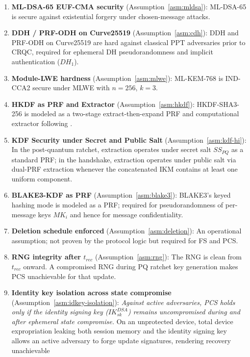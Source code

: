 \documentclass[11pt,a4paper]{article}
\theoremstyle{remark}
\theoremstyle{plain}
\begin{document}
\begin{enumerate}
  \item \textbf{ML-DSA-65 EUF-CMA security} (Assumption~\ref{asm:mldsa}): ML-DSA-65 is secure
        against existential forgery under chosen-message attacks.
  \item \textbf{DDH / PRF-ODH on Curve25519} (Assumption~\ref{asm:cdh}): DDH and PRF-ODH on Curve25519 are hard
        against classical PPT adversaries prior to CRQC, required for ephemeral DH pseudorandomness and implicit authentication ($DH_1$).
  \item \textbf{Module-LWE hardness} (Assumption~\ref{asm:mlwe}): ML-KEM-768 is IND-CCA2
        secure under MLWE with $n = 256$, $k = 3$.
  \item \textbf{HKDF as PRF and Extractor} (Assumption~\ref{asm:hkdf}): HKDF-SHA3-256 is modeled as a
        two-stage extract-then-expand PRF and computational extractor following \cite{krawczyk2010hkdf}.
  \item \textbf{KDF Security under Secret and Public Salt} (Assumption~\ref{asm:kdf-hi}): In the post-quantum
        ratchet, extraction operates under secret salt $SS_{PQ}$ as a standard PRF; in the handshake, extraction
        operates under public salt via dual-PRF extraction whenever the concatenated IKM contains at least one uniform component.
  \item \textbf{BLAKE3-KDF as PRF} (Assumption~\ref{asm:blake3}): BLAKE3's keyed hashing
        mode is modeled as a PRF; required for pseudorandomness of per-message keys $MK_i$
        and hence for message confidentiality.
  \item \textbf{Deletion schedule enforced} (Assumption~\ref{asm:deletion}): An operational
        assumption; not proven by the protocol logic but required for FS and PCS.
  \item \textbf{RNG integrity after $t_{rec}$} (Assumption~\ref{asm:rng}): The RNG is clean
        from $t_{rec}$ onward.  A compromised RNG during PQ ratchet key generation makes PCS
        unachievable for that update.
  \item \textbf{Identity key isolation across state compromise} (Assumption~\ref{asm:idkey-isolation}):
        \emph{Against active adversaries, PCS holds only if the identity signing key ($IK^{DSA}_{sk}$) remains uncompromised during
        and after ephemeral state compromise.}  On an unprotected device, total device expropriation leaking both session memory
        and the identity signing key allows an active adversary to forge update signatures, rendering recovery unachievable

\end{enumerate}
\end{document}

